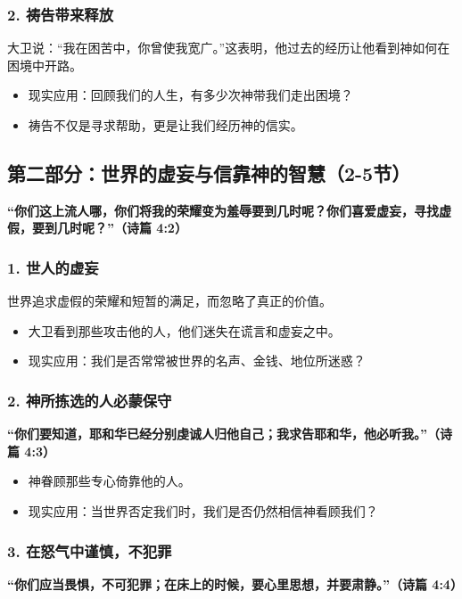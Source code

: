 \documentclass[a4paper, 12pt]{article}
\begin{document}
\subsubsection*{2. 祷告带来释放}
大卫说：“我在困苦中，你曾使我宽广。”这表明，他过去的经历让他看到神如何在困境中开路。
\begin{itemize}
    \item 现实应用：回顾我们的人生，有多少次神带我们走出困境？
    \item 祷告不仅是寻求帮助，更是让我们经历神的信实。
\end{itemize}

\subsection*{第二部分：世界的虚妄与信靠神的智慧（2-5节）}

\textbf{“你们这上流人哪，你们将我的荣耀变为羞辱要到几时呢？你们喜爱虚妄，寻找虚假，要到几时呢？”（诗篇 4:2）}

\subsubsection*{1. 世人的虚妄}
世界追求虚假的荣耀和短暂的满足，而忽略了真正的价值。
\begin{itemize}
    \item 大卫看到那些攻击他的人，他们迷失在谎言和虚妄之中。
    \item 现实应用：我们是否常常被世界的名声、金钱、地位所迷惑？
\end{itemize}

\subsubsection*{2. 神所拣选的人必蒙保守}
\textbf{“你们要知道，耶和华已经分别虔诚人归他自己；我求告耶和华，他必听我。”（诗篇 4:3）}

\begin{itemize}
    \item 神眷顾那些专心倚靠他的人。
    \item 现实应用：当世界否定我们时，我们是否仍然相信神看顾我们？
\end{itemize}

\subsubsection*{3. 在怒气中谨慎，不犯罪}
\textbf{“你们应当畏惧，不可犯罪；在床上的时候，要心里思想，并要肃静。”（诗篇 4:4）}
\end{document}
